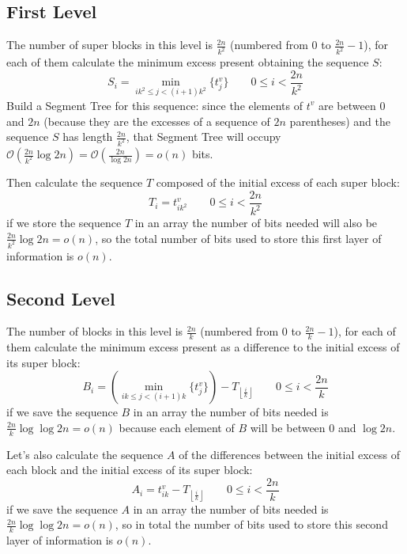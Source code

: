 \documentclass{article}
\begin{document}
\subsection{First Level}
The number of super blocks in this level is $\frac{2n}{k^2}$ (numbered from $0$ to $\frac{2n}{k^2}-1$), for each of them calculate the minimum excess present obtaining the sequence $S$:
    $$
    S_i = \min_{ik^2 \leq j < (i+1)k^2}\{t^v_j\} \qquad 0\leq i < \frac{2n}{k^2}
    $$
Build a Segment Tree for this sequence: since the elements of $t^v$ are between $0$ and $2n$ (because they are the excesses of a sequence of $2n$ parentheses) and the sequence $S$ has length $\frac{2n}{k^2}$, that Segment Tree will occupy $\mathcal{O}(\frac{2n}{k^2}\log{2n})=\mathcal{O}(\frac{2n}{\log{2n}})=o(n)$ bits.

Then calculate the sequence $T$ composed of the initial excess of each super block:
    $$
    T_i = t^v_{ik^2} \qquad 0\leq i < \frac{2n}{k^2}
    $$
if we store the sequence $T$ in an array the number of bits needed will also be $ \frac{2n}{k^2}\log{2n}=o(n)$, so the total number of bits used to store this first layer of information is $o(n)$.

\subsection{Second Level}
The number of blocks in this level is $\frac{2n}{k}$ (numbered from $0$ to $\frac{2n}{k}-1$), for each of them calculate the minimum excess present as a difference to the initial excess of its super block:
    $$
    B_i = \left(\min_{ik \leq j < (i+1)k}\{t^v_j\}\right)-T_{\left\lfloor{\frac{i}{k}}\right\rfloor} \qquad 0\leq i < \frac{2n}{k}
    $$
if we save the sequence $B$ in an array the number of bits needed is $\frac{2n}{k}\log{\log{2n}}=o(n)$ because each element of $B$ will be between $0$ and $\log{2n}$.

Let's also calculate the sequence $A$ of the differences between the initial excess of each block and the initial excess of its super block:
    $$
    A_i = t^v_{ik}-T_{\left\lfloor{\frac{i}{k}}\right\rfloor} \qquad 0\leq i < \frac{2n}{k}
    $$
if we save the sequence $A$ in an array the number of bits needed is $\frac{2n}{k}\log{\log{2n}}=o(n)$, so in total the number of bits used to store this second layer of information is $o(n)$.
\end{document}
